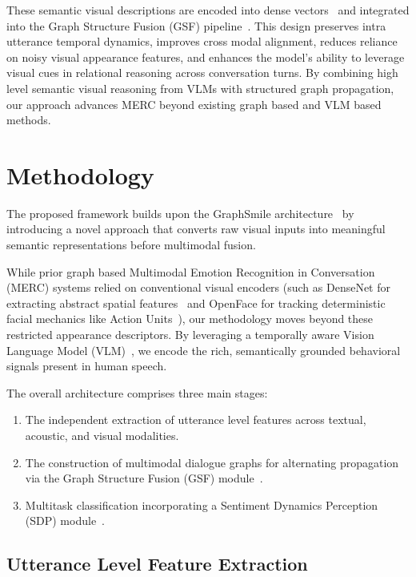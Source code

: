 \documentclass[runningheads]{llncs}
\begin{document}
These semantic visual descriptions are encoded into dense vectors~\cite{devlin2019bert} and integrated into the Graph Structure Fusion (GSF) pipeline~\cite{li2024graphsmile}. This design preserves intra utterance temporal dynamics, improves cross modal alignment, reduces reliance on noisy visual appearance features, and enhances the model's ability to leverage visual cues in relational reasoning across conversation turns. By combining high level semantic visual reasoning from VLMs with structured graph propagation, our approach advances MERC beyond existing graph based and VLM based methods.

\section{Methodology}
\label{sec:methodology}

The proposed framework builds upon the GraphSmile architecture~\cite{li2024graphsmile} by introducing a novel approach that converts raw visual inputs into meaningful semantic representations before multimodal fusion.

While prior graph based Multimodal Emotion Recognition in Conversation (MERC) systems relied on conventional visual encoders (such as DenseNet for extracting abstract spatial features~\cite{huang2017densely} and OpenFace for tracking deterministic facial mechanics like Action Units~\cite{baltrusaitis2018openface}), our methodology moves beyond these restricted appearance descriptors. By leveraging a temporally aware Vision Language Model (VLM)~\cite{radford2021clip,qwen2_5_vl}, we encode the rich, semantically grounded behavioral signals present in human speech.

The overall architecture comprises three main stages:
\begin{enumerate}
  \item The independent extraction of utterance level features across textual, acoustic, and visual modalities.
  \item The construction of multimodal dialogue graphs for alternating propagation via the Graph Structure Fusion (GSF) module~\cite{li2024graphsmile}.
  \item Multitask classification incorporating a Sentiment Dynamics Perception (SDP) module~\cite{li2024graphsmile}.
\end{enumerate}

\subsection{Utterance Level Feature Extraction}
\end{document}
